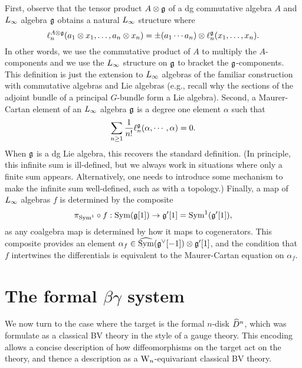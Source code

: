 First, observe that the tensor product $A \otimes \mathfrak g$ of a dg commutative algebra $A$ 
and $\L8$ algebra $\mathfrak g$ obtains a natural $\L8$ structure where
\[
\ell_n^{A \otimes \mathfrak g}(a_1 \otimes x_1, \ldots, a_n \otimes x_n) = \pm (a_1 \cdots a_n) \otimes \ell_n^{\mathfrak g}(x_1,\ldots,x_n).
\]
In other words, we use the commutative product of $A$ to multiply the $A$-components 
and we use the $\L8$ structure on $\mathfrak g$ to bracket the $\mathfrak g$-components.
This definition is just the extension to $\L8$ algebras of the familiar construction 
with commutative algebras and Lie algebras 
(e.g., recall why the sections of the adjoint bundle of a principal $G$-bundle form a Lie algebra).
Second, a Maurer-Cartan element of an $\L8$ algebra $\mathfrak g$ is a degree one element $\alpha$ such that
\[
\sum_{n \geq 1} \frac{1}{n!} \ell^{\mathfrak g}_n(\alpha, \cdots,\alpha) = 0.
\]
When $\mathfrak g$ is a dg Lie algebra, this recovers the standard definition.
(In principle, this infinite sum is ill-defined, but we always work in situations where only a finite sum appears.
Alternatively, one needs to introduce some mechanism to make the infinite sum well-defined, such as with a topology.)
Finally, a map of $\L8$ algebras $f$ is determined by the composite 
\[
\pi_{{\rm Sym}^1} \circ f: {\rm Sym}(\mathfrak g[1]) \to \mathfrak g'[1] = {\rm Sym}^1(\mathfrak g'[1]),
\]
as any coalgebra map is determined by how it maps to cogenerators.
This composite provides an element $\alpha_f \in \widehat{{\rm Sym}}(\mathfrak g^\vee[-1]) \otimes \mathfrak g'[1]$,
and the condition that $f$ intertwines the differentials is equivalent 
to the Maurer-Cartan equation on $\alpha_f$.

\section{The formal $\beta\gamma$ system}
\label{sec formal}

We now turn to the case where the target is the formal $n$-disk $\widehat{D}^n$,
which was formulate as a classical BV theory in the style of a gauge theory.
This encoding allows a concise description of how diffeomorphisms on the target act on the theory,
and thence a description as a ${{\rm W}_n}$-equivariant classical BV theory.


